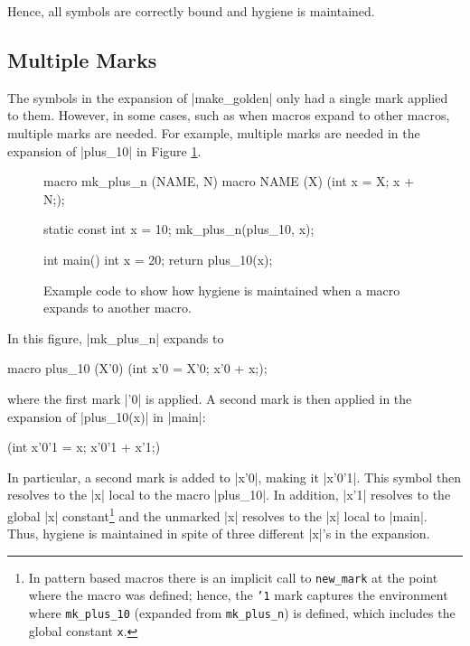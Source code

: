 
Hence, all symbols are correctly bound and hygiene is maintained.


\subsection{Multiple Marks}

The symbols in the expansion of |make_golden| only had a single mark
applied to them.  However, in some cases, such as when macros expand
to other macros, multiple marks are needed.
For example, multiple marks are needed in the expansion of |plus_10|
in Figure \ref{macro-macro}.  
\begin{figure}
\begin{codef}
macro mk_plus_n (NAME, N) {
  macro NAME (X) { ({int x = X; x + N;}); }
}

static const int x = 10;
mk_plus_n(plus_10, x);

int main() {
  int x = 20;
  return plus_10(x);
}
\end{codef}
\caption{Example code to show how hygiene is maintained when a macro
  expands to another macro.}
\label{macro-macro}
\end{figure}
In this figure, |mk_plus_n| expands to
\begin{code}
macro plus_10 (X'0) { ({int x'0 = X'0; x'0 + x;}); }
\end{code}
where the first mark |'0| is applied.  A second mark is then applied
in the expansion of |plus_10(x)| in |main|:
\begin{code}
{ ({int x'0'1 = x; x'0'1 + x'1;}) }
\end{code}
In particular, a second mark is added to |x'0|, making it |x'0'1|.
This symbol then resolves to the |x| local to the macro |plus_10|.  In
addition, |x'1| resolves to the global |x| constant\footnote{In pattern
based macros there is an implicit call to \texttt{new\_mark} at the point
where the macro was defined; hence, the \texttt{'1} mark captures the
environment where \texttt{mk\_plus\_10} (expanded from \texttt{mk\_plus\_n}) 
is defined, which includes the global
constant \texttt{x}.} and the unmarked |x| resolves to the |x| local to
|main|.  Thus, hygiene is maintained in spite of three different |x|'s
in the expansion.

